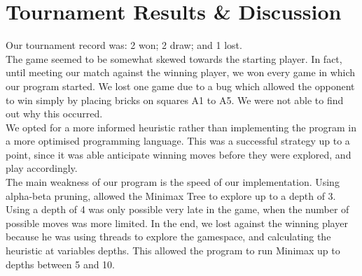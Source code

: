 \documentclass[10pt]{article}
\begin{document}
\section{Tournament Results \& Discussion}
Our tournament record was: 2 won; 2 draw; and 1 lost. \\
The game seemed to be somewhat skewed towards the starting player. In fact, until meeting our match against the winning player, we won every game in which our program started. We lost one game due to a bug which allowed the opponent to win simply by placing bricks on squares A1 to A5. We were not able to find out why this occurred. \\
We opted for a more informed heuristic rather than implementing the program in a more optimised programming language. This was a successful strategy up to a point, since it was able anticipate winning moves before they were explored, and play accordingly. \\
The main weakness of our program is the speed of our implementation. Using alpha-beta pruning, allowed the Minimax Tree to explore up to a depth of 3. Using a depth of 4 was only possible very late in the game, when the number of possible moves was more limited. In the end, we lost against the winning player because he was using threads to explore the gamespace, and calculating the heuristic at variables depths. This allowed the program to run Minimax up to depths between 5 and 10.
\end{document}

